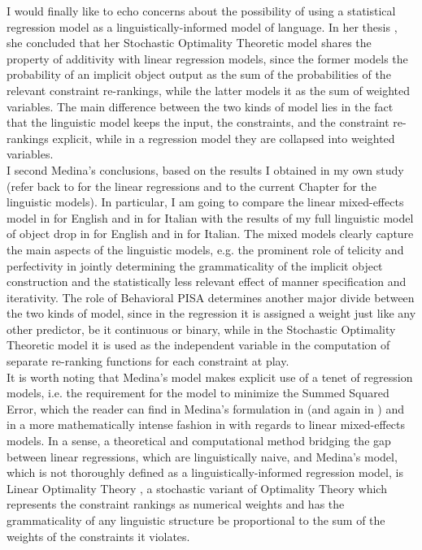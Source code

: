 I would finally like to echo  concerns about the possibility of using a statistical regression model as a linguistically-informed model of language. In her thesis \parencite[132-133]{Medina2007}, she concluded that her Stochastic Optimality Theoretic model shares the property of additivity with linear regression models, since the former models the probability of an implicit object output as the sum of the probabilities of the relevant constraint re-rankings, while the latter models it as the sum of weighted variables. The main difference between the two kinds of model lies in the fact that the linguistic model keeps the input, the constraints, and the constraint re-rankings explicit, while in a regression model they are collapsed into weighted variables.\\
I second Medina's conclusions, based on the results I obtained in my own study (refer back to  for the linear regressions and to the current Chapter for the linguistic models). In particular, I am going to compare the linear mixed-effects model in  for English and in  for Italian with the results of my full linguistic model of object drop in  for English and in  for Italian. The mixed models clearly capture the main aspects of the linguistic models, e.g. the prominent role of telicity and perfectivity in jointly determining the grammaticality of the implicit object construction and the statistically less relevant effect of manner specification and iterativity. The role of Behavioral PISA determines another major divide between the two kinds of model, since in the regression it is assigned a weight just like any other predictor, be it continuous or binary, while in the Stochastic Optimality Theoretic model it is used as the independent variable in the computation of separate re-ranking functions for each constraint at play.\\
It is worth noting that Medina's model makes explicit use of a tenet of regression models, i.e. the requirement for the model to minimize the Summed Squared Error, which the reader can find in Medina's formulation in  (and again in ) and in a more mathematically intense fashion in \textcite[13]{r_lmer} with regards to linear mixed-effects models. In a sense, a theoretical and computational method bridging the gap between linear regressions, which are linguistically naive, and Medina's model, which is not thoroughly defined as a linguistically-informed regression model, is Linear Optimality Theory \parencite{Keller2000, Keller2006}, a stochastic variant of Optimality Theory which represents the constraint rankings as numerical weights and has the grammaticality of any linguistic structure be proportional to the sum of the weights of the constraints it violates.
